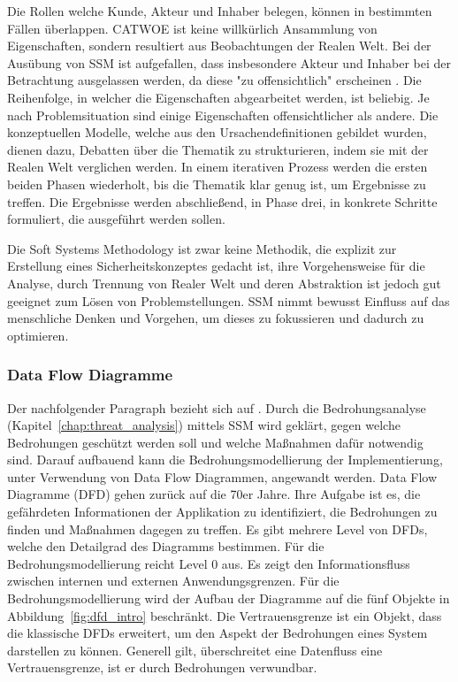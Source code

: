 \documentclass[11pt,a4paper]{report}
\begin{document}
Die Rollen welche Kunde, Akteur und Inhaber belegen, können in bestimmten Fällen überlappen. CATWOE ist keine willkürlich Ansammlung von Eigenschaften, sondern resultiert aus Beobachtungen der Realen Welt. Bei der Ausübung von SSM ist aufgefallen, dass insbesondere Akteur und Inhaber bei der Betrachtung ausgelassen werden, da diese "zu offensichtlich" erscheinen \cite[s.~255]{gutmann}. Die Reihenfolge, in welcher die Eigenschaften abgearbeitet werden, ist beliebig. Je nach Problemsituation sind einige Eigenschaften offensichtlicher als andere. Die konzeptuellen Modelle, welche aus den Ursachendefinitionen gebildet wurden, dienen dazu, Debatten über die Thematik zu strukturieren, indem sie mit der Realen Welt verglichen werden. In einem iterativen Prozess werden die ersten beiden Phasen wiederholt, bis die Thematik klar genug ist, um Ergebnisse zu treffen. Die Ergebnisse werden abschließend, in Phase drei, in konkrete Schritte formuliert, die ausgeführt werden sollen.

Die Soft Systems Methodology ist zwar keine Methodik, die explizit zur Erstellung eines Sicherheitskonzeptes gedacht ist, ihre Vorgehensweise für die Analyse, durch Trennung von Realer Welt und deren Abstraktion ist jedoch gut geeignet zum Lösen von Problemstellungen. SSM nimmt bewusst Einfluss auf das menschliche Denken und Vorgehen, um dieses zu fokussieren und dadurch zu optimieren.

\subsubsection{Data Flow Diagramme}

Der nachfolgender Paragraph bezieht sich auf \cite[s.~263]{gutmann}.
Durch die Bedrohungsanalyse (Kapitel~\ref{chap:threat_analysis}) mittels SSM wird geklärt, gegen welche Bedrohungen geschützt werden soll und welche Maßnahmen dafür notwendig sind. Darauf aufbauend kann die Bedrohungsmodellierung der Implementierung, unter Verwendung von Data Flow Diagrammen, angewandt werden. Data Flow Diagramme (DFD) gehen zurück auf die 70er Jahre. Ihre Aufgabe ist es, die gefährdeten Informationen der Applikation zu identifiziert, die Bedrohungen zu finden und Maßnahmen dagegen zu treffen. Es gibt mehrere Level von DFDs, welche den Detailgrad des Diagramms bestimmen. Für die Bedrohungsmodellierung reicht Level 0 aus. Es zeigt den Informationsfluss zwischen internen und externen Anwendungsgrenzen. Für die Bedrohungsmodellierung wird der Aufbau der Diagramme auf die fünf Objekte in Abbildung~\ref{fig:dfd_intro} beschränkt. Die Vertrauensgrenze ist ein Objekt, dass die klassische DFDs erweitert, um den Aspekt der Bedrohungen eines System darstellen zu können. Generell gilt, überschreitet eine Datenfluss eine Vertrauensgrenze, ist er durch Bedrohungen verwundbar.
\end{document}
